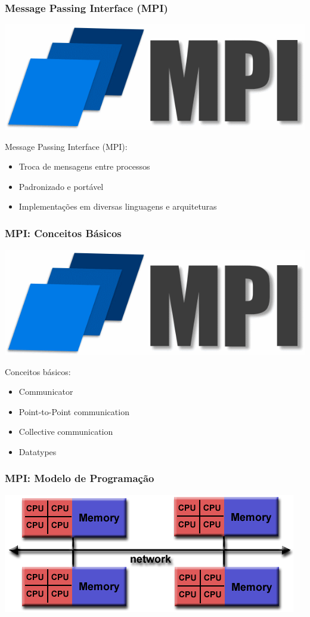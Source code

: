 \documentclass[12pt, compress]{beamer}
\begin{document}
\begin{frame}
    \frametitle{Message Passing Interface (MPI)}
    \begin{center}
        \includegraphics[width=.3\textwidth]{mpi-logo}
    \end{center}

    Message Passing Interface (\alert{MPI}):

    \begin{itemize}
        \item \alert{Troca de mensagens} entre \alert{processos}
        \item \alert{Padronizado} e \alert{portável}
        \item Implementações em diversas \alert{linguagens} e
            \alert{arquiteturas}
    \end{itemize}
\end{frame}

\begin{frame}
    \frametitle{MPI: Conceitos Básicos}
    \begin{center}
        \includegraphics[width=.3\textwidth]{mpi-logo}
    \end{center}

    Conceitos básicos:

    \begin{itemize}
        \item \alert{Communicator}
        \item \alert{Point-to-Point} communication
        \item \alert{Collective} communication
        \item \alert{Datatypes}
    \end{itemize}
\end{frame}

\begin{frame}
    \frametitle{MPI: Modelo de Programação}
    \begin{center}
        \includegraphics[width=\textwidth]{hybrid-mem}
    \end{center}
\end{frame}
\end{document}
